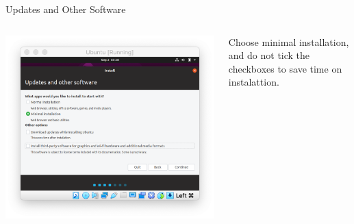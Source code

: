 \documentclass[11pt]{beamer}
\begin{document}
\begin{frame}{Updates and Other Software}
  \begin{columns}
    \begin{column}{0.65\linewidth}
      \includegraphics[width=\linewidth]{ubuntu-update}
    \end{column}
    \begin{column}{0.35\linewidth}
      Choose minimal installation, and do not tick the checkboxes to save time on instalattion.
    \end{column}
  \end{columns}
\end{frame}
\end{document}
